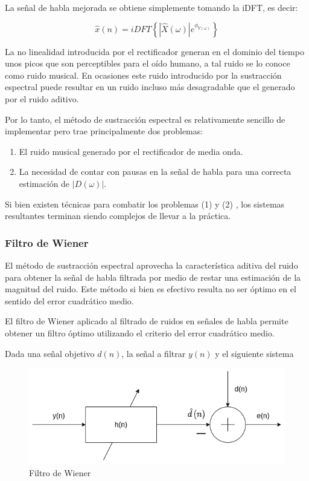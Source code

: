 La señal de habla mejorada se obtiene simplemente tomando la iDFT, es decir:

\begin{equation*}
	\hat{x}(n) = iDFT \left\{ |\hat{X}(\omega)| e^{\phi_{Y(\omega)}} \right\}
\end{equation*}

La no linealidad introducida por el rectificador generan en el dominio del tiempo unos picos que son perceptibles para el oído humano, a tal ruido se lo conoce como ruido musical. En ocasiones este ruido introducido por la sustracción espectral puede resultar en un ruido incluso más desagradable que el generado por el ruido aditivo.

Por lo tanto, el método de sustracción espectral es relativamente sencillo de implementar pero trae principalmente dos problemas:

\begin{enumerate}
	\item El ruido musical generado por el rectificador de media onda.
	\item La necesidad de contar con pausas en la señal de habla para una correcta estimación de $|D(\omega)|$.
\end{enumerate}

Si bien existen técnicas para combatir los problemas (1) y (2) \cite{speech_enhancement_theory_and_practice}, los sistemas resultantes terminan siendo complejos de llevar a la práctica.

\subsubsection{Filtro de Wiener}

El método de sustracción espectral aprovecha la característica aditiva del ruido para obtener la señal de habla filtrada por medio de restar una estimación de la magnitud del ruido. Este método si bien es efectivo resulta no ser óptimo en el sentido del error cuadrático medio. 

El filtro de Wiener aplicado al filtrado de ruidos en señales de habla permite obtener un filtro óptimo utilizando el criterio del error cuadrático medio. 

Dada una señal objetivo $d(n)$, la señal a filtrar $y(n)$ y el siguiente sistema


\begin{figure}[H]
	\centering
	\centerline{\includegraphics[scale=0.6]{images/ch3/wiener.png}}
	\caption{Filtro de Wiener}
	\label{fig:ch3_wiener_filter}
\end{figure}


